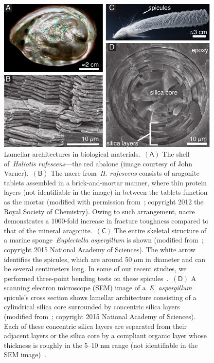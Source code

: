\documentclass[preprint,10pt,times]{elsarticle}
\numberwithin{equation}{section}
\newcommand{\pr}[1]{\left( #1 \right)}
\newcommand{\subf}[1]{\pr{\textsf{#1}}}
\begin{document}
\begin{figure}
\begin{centering}
\includegraphics[width=1\textwidth]{../Figures_Submit/Lamellar_V3.pdf}
\par\end{centering}
\label{fig:lamellar}
\caption{Lamellar architectures in biological materials.~$\subf{A}$
The shell of~\textit{Haliotis rufescens}---the red abalone (image
courtesy of John Varner).~$\subf{B}$ The nacre from~\textit{H. rufescens}
consists of aragonite tablets assembled in a brick-and-mortar manner,
where thin protein layers (not identifiable in the image) in-between
the tablets function as the mortar (modified with permission from~\cite{rabiei2012nacre}; copyright 2012 the Royal Society of Chemistry). Owing to such arrangement,
nacre demonstrates a 1000-fold increase in fracture toughness compared
to that of the mineral aragonite.~$\subf{C}$ The entire skeletal
structure of a marine sponge~\textit{Euplectella aspergillum} is
shown (modified from~\cite{monn2015new}; copyright 2015 National Academy of Sciences). The white arrow identifies
the spicules, which are around 50$~\mu$m in diameter and can be several
centimeters long. In some of our recent studies, we performed three-point
bending tests on these spicules~\cite{monn2017enhanced,monn2020lamellar}.~$\subf{D}$
A scanning electron microscope (SEM) image of a~\textit{E. aspergillum}
spicule's cross section shows lamellar architecture consisting of
a cylindrical silica core surrounded by concentric silica layers (modified
from~\cite{monn2015new}; copyright 2015 National Academy of Sciences). Each of these concentric silica layers
are separated from their adjacent layers or the silica
core  by a compliant organic layer whose thickness
is roughly in the 5--10 nm range (not identifiable in the SEM image)~\cite{weaver2007hierarchical}.}
\end{figure}
\end{document}
